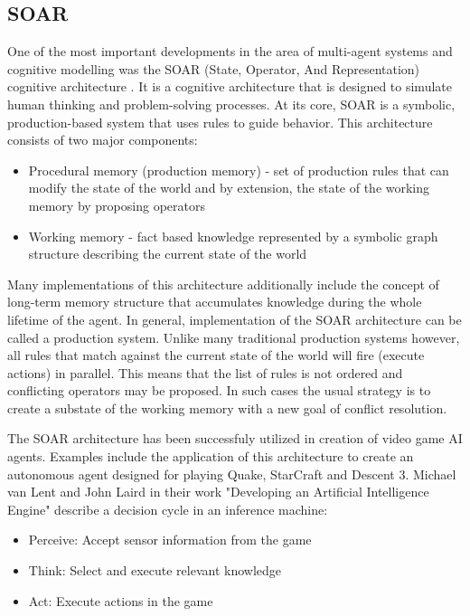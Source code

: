 \subsection{SOAR}

One of the most important developments in the area of multi-agent systems and cognitive modelling was the SOAR (State, Operator, And Representation) cognitive architecture \cite{laird2019soar}.
It is a cognitive architecture that is designed to simulate human thinking and problem-solving processes.
At its core, SOAR is a symbolic, production-based system that uses rules to guide behavior.
This architecture consists of two major components:

\begin{itemize}
    \item Procedural memory (production memory) - set of production rules that can modify the state of the world and by extension, the state of the working memory by proposing operators
    \item Working memory - fact based knowledge represented by a symbolic graph structure describing the current state of the world
\end{itemize}

Many implementations of this architecture additionally include the concept of long-term memory structure that accumulates knowledge during the whole lifetime of the agent.
In general, implementation of the SOAR architecture can be called a production system.
Unlike many traditional production systems however, all rules that match against the current state of the world will fire (execute actions) in parallel.
This means that the list of rules is not ordered and conflicting operators may be proposed.
In such cases the usual strategy is to create a substate of the working memory with a new goal of conflict resolution.

The SOAR architecture has been successfuly utilized in creation of video game AI agents.
Examples include the application of this architecture to create an autonomous agent designed for playing Quake\cite{laird2001knows}, StarCraft\cite{turner2013soar-sc} and Descent 3\cite{van1999developing}.
Michael van Lent and John Laird in their work "Developing an Artificial Intelligence Engine"\cite{van1999developing} describe a decision cycle in an inference machine:

\begin{itemize}
    \item Perceive: Accept sensor information from the game
    \item Think: Select and execute relevant knowledge
    \item Act: Execute actions in the game
\end{itemize}

